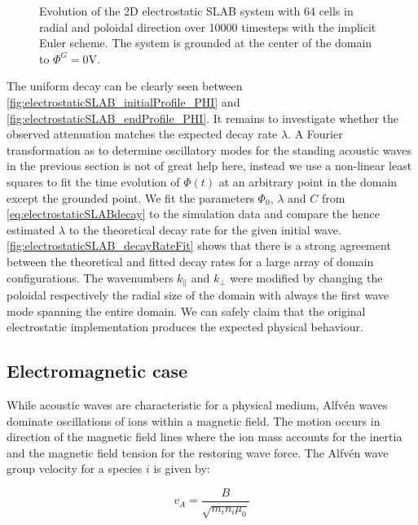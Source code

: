 \begin{figure}[H]
\begin{subfigure}[b]{0.30\textwidth}
		\label{fig:electrostaticSLAB_decayRateFit}
	\end{subfigure}
	\caption{Evolution of the 2D electrostatic SLAB system with 64 cells in radial and poloidal direction over 10000 timesteps with the implicit Euler scheme. The system is grounded at the center of the domain to $\Phi^G = 0$V.}
	\label{fig:electrostaticSLAB}
\end{figure}

The uniform decay can be clearly seen between \autoref{fig:electrostaticSLAB_initialProfile_PHI} and \autoref{fig:electrostaticSLAB_endProfile_PHI}. It remains to investigate whether the observed attenuation matches the expected decay rate $\lambda$. A Fourier transformation as to determine oscillatory modes for the standing acoustic waves in the previous section is not of great help here, instead we use a non-linear least squares to fit the time evolution of $\Phi(t)$ at an arbitrary point in the domain except the grounded point. We fit the parameters $\Phi_0$, $\lambda$ and $C$ from \autoref{eq:electrostaticSLABdecay} to the simulation data and compare the hence estimated $\lambda$ to the theoretical decay rate for the given initial wave. \autoref{fig:electrostaticSLAB_decayRateFit} shows that there is a strong agreement between the theoretical and fitted decay rates for a large array of domain configurations. The wavenumbers $k_\parallel$ and $k_\perp$ were modified by changing the poloidal respectively the radial size of the domain with always the first wave mode spanning the entire domain. We can safely claim that the original electrostatic implementation produces the expected physical behaviour.

\subsection{Electromagnetic case}
While acoustic waves are characteristic for a physical medium, Alfvén waves dominate oscillations of ions within a magnetic field. The motion occurs in direction of the magnetic field lines where the ion mass accounts for the inertia and the magnetic field tension for the restoring wave force. The Alfvén wave group velocity for a species $i$ is given by:

\begin{equation}
	v_A = \frac{B}{\sqrt{m_in_i\mu_0}} \label{eq:AlfvenGroupVelocity}
\end{equation}

